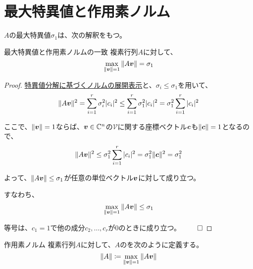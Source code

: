 \documentclass[../../../topic_linear-algebra]{subfiles}
\begin{document}
\sectionline
\section{最大特異値と作用素ノルム}

$A$の最大特異値$\sigma_1$は、次の解釈をもつ。

\begin{theorem}{最大特異値と作用素ノルムの一致}
  複素行列$A$に対して、
  \begin{equation*}
    \max_{\| \vb*{v} \| = 1}{\| A \vb*{v} \|} = \sigma_1
  \end{equation*}
\end{theorem}

\begin{proof}
  \hyperref[thm:norm-expansion-svd]{特異値分解に基づくノルムの展開表示}と、$\sigma_i \leq \sigma_1$を用いて、
  \begin{equation*}
    \| A \vb*{v} \|^2 = \sum_{i=1}^r \sigma_i^2 |c_i|^2 \leq \sum_{i=1}^r \sigma_1^2 |c_i|^2 = \sigma_1^2 \sum_{i=1}^r |c_i|^2
  \end{equation*}
  
  ここで、$\| \vb*{v} \| = 1$ならば、$\vb*{v} \in \mathbb{C}^n$の$\mathcal{V}$に関する座標ベクトル$\vb*{c}$も$\| \vb*{c} \| = 1$となるので、
  \begin{equation*}
    \| A \vb*{v} \|^2 \leq \sigma_1^2 \sum_{i=1}^r |c_i|^2 = \sigma_1^2 \| \vb*{c} \|^2 = \sigma_1^2
  \end{equation*}
  
  よって、$\| A \vb*{v} \| \leq \sigma_1$が任意の単位ベクトル$\vb*{v}$に対して成り立つ。
  
  すなわち、
  \begin{equation*}
    \max_{\| \vb*{v} \| = 1} \| A \vb*{v} \| \leq \sigma_1
  \end{equation*}
  
  等号は、$c_1 = 1$で他の成分$c_2, \dots, c_r$が0のときに成り立つ。 $\qed$
\end{proof}

\br

\begin{definition}{作用素ノルム}
  複素行列$A$に対して、$A$のを次のように定義する。
  \begin{equation*}
    \| A \| \coloneq \max_{\| \vb*{v} \| = 1} \| A \vb*{v} \|
  \end{equation*}
\end{definition}
\end{document}
